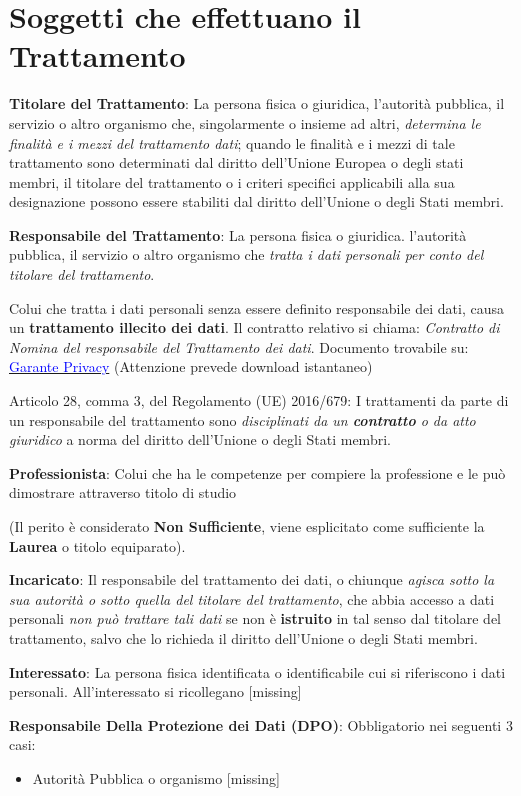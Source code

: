 \documentclass[twocolumn]{article}
\newcommand{\definition}[1]{\begin{mycolorbox}[colback=colorone]
\fontfamily{qcr}\selectfont #1 \fontfamily{cmr}\selectfont
\end{mycolorbox}}
\begin{document}
\section{Soggetti che effettuano il Trattamento}
\definition{\textbf{Titolare del Trattamento}: La persona fisica o giuridica, l'autorità pubblica, il servizio o altro organismo che, singolarmente o insieme ad altri, \textit{determina le finalità e i mezzi del trattamento dati}; quando le finalità e i mezzi di tale trattamento sono determinati dal diritto dell'Unione Europea o degli stati membri, il titolare del trattamento o i criteri specifici applicabili alla sua designazione possono essere stabiliti dal diritto dell'Unione o degli Stati membri. }
\definition{\textbf{Responsabile del Trattamento}: La persona fisica o giuridica. l'autorità pubblica, il servizio o altro organismo che \textit{tratta i dati personali per conto del titolare del trattamento}.} Colui che tratta i dati personali senza essere definito responsabile dei dati, causa un \textbf{trattamento illecito dei dati}. Il contratto relativo si chiama: \textit{Contratto di Nomina del responsabile del Trattamento dei dati}. Documento trovabile su: \href{https://www.garanteprivacy.it/web/guest/home/docweb/-/docweb-display/docweb/7322273}{\textcolor{blue}{Garante Privacy}} (Attenzione prevede download istantaneo)

Articolo 28, comma 3, del Regolamento (UE) 2016/679: I trattamenti da parte di un responsabile del trattamento sono \textit{disciplinati da un \textbf{contratto} o da atto giuridico} a norma del diritto dell'Unione o degli Stati membri.
\definition{\textbf{Professionista}: Colui che ha le competenze per compiere la professione e le può dimostrare attraverso titolo di studio} (Il perito è considerato \textbf{Non Sufficiente}, viene esplicitato come sufficiente la \textbf{Laurea} o titolo equiparato).
\definition{\textbf{Incaricato}: Il responsabile del trattamento dei dati, o chiunque \textit{agisca sotto la sua autorità o sotto quella del titolare del trattamento}, che abbia accesso a dati personali \textit{non può trattare tali dati} se non è \textbf{istruito} in tal senso dal titolare del trattamento, salvo che lo richieda il diritto dell'Unione o degli Stati membri. }
\definition{\textbf{Interessato}: La persona fisica identificata o identificabile cui si riferiscono i dati personali. All'interessato si ricollegano [missing]}
\definition{\textbf{Responsabile Della Protezione dei Dati (DPO)}: Obbligatorio nei seguenti 3 casi: \begin{itemize}
    \item Autorità Pubblica o organismo [missing]
\end{itemize}}
\end{document}
